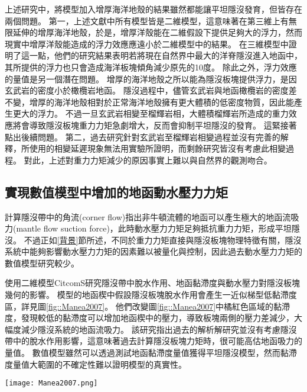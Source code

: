 上述研究中，將模型加入增厚海洋地殼的結果雖然都能讓平坦隱沒發育，但皆存在兩個問題。
第一，上述文獻中所有模型皆是二維模型，這意味著在第三維上有無限延伸的增厚海洋地殼，於是，增厚洋殼能在二維假設下提供足夠大的浮力，然而現實中增厚洋殼能造成的浮力效應應遠小於二維模型中的結果。
\citealp{florez2019impact}在三維模型中證明了這一點，他們的研究結果表明若將現在自然界中最大的洋脊隱沒進入地函中，其所提供的浮力也只會造成海洋板塊傾角減少原先的10度。
除此之外，浮力效應的量值是另一個潛在問題。
增厚的海洋地殼之所以能為隱沒板塊提供浮力，是因玄武岩的密度小於橄欖岩地函。
隱沒過程中，儘管玄武岩與地函橄欖岩的密度差不變，增厚的海洋地殼相對於正常海洋地殼擁有更大體積的低密度物質，因此能產生更大的浮力。
不過一旦玄武岩相變至榴輝岩相，大體積榴輝岩所造成的重力效應將會導致隱沒板塊重力力矩急劇增大，反而會抑制平坦隱沒的發育。
這緊接著點出後續問題。
第二，過去研究針對玄武岩至榴輝岩相變過程並沒有完善的解釋，\citealp{van2002role}所使用的相變延遲現象無法用實驗所證明，而剩餘研究皆沒有考慮此相變過程。
對此，上述對重力力矩減少的原因事實上難以與自然界的觀測吻合。


\subsection{實現數值模型中增加的地函動水壓力力矩}
\citealp{tovish1978mantle}計算隱沒帶中的角流(corner flow)指出非牛頓流體的地函可以產生極大的地函流吸力(mantle flow suction force)，此時動水壓力力矩足夠抵抗重力力矩，形成平坦隱沒。
不過正如\ref{背景}節所述，不同於重力力矩直接與隱沒板塊物理特徵有關，隱沒系統中能夠影響動水壓力力矩的因素難以被量化與控制，因此過去動水壓力力矩的數值模型研究較少。

\citealp{Manea2007}使用二維模型CitcomS研究隱沒帶中脫水作用、地函黏滯度與動水壓力對隱沒板塊幾何的影響。
模型的地函楔中假設隱沒板塊脫水作用會產生一近似梯型低黏滯度區，詳見圖\ref{fig::Manea2007}。
他們改變圖\ref{fig::Manea2007}中橘紅色區域的黏滯度，發現較低的黏滯度可以增加地函楔中的壓力，導致板塊兩側的壓力差減少，大幅度減少隱沒系統的地函流吸力。
該研究指出過去\citealp{tovish1978mantle}的解析解研究並沒有考慮隱沒帶中的脫水作用影響，這意味著過去計算隱沒板塊力矩時，很可能高估地函吸力的量值。
數值模型雖然可以透過測試地函黏滯度量值獲得平坦隱沒模型，然而黏滯度量值大範圍的不確定性難以證明模型的真實性。

\begin{figure*}[ht!]
    \centering
    \texttt{[image: Manea2007.png]}
    \caption[\citealp{Manea2007}模型中所設定的低黏滯度近似梯形區與低黏滯度通道區域]{\citealp{Manea2007}模型中所設定的低黏滯度近似梯形區與低黏滯度通道區域，表示隱沒帶的脫水作用對地函楔造成的影響。}
    \label{fig::Manea2007}
\end{figure*}

